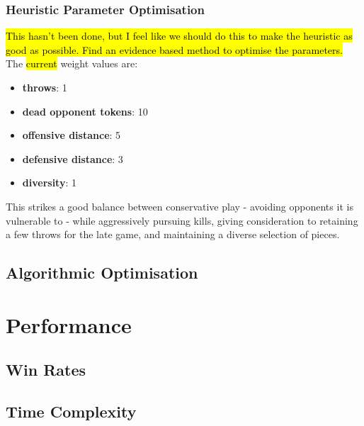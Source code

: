 \documentclass{article}
\begin{document}
\subsubsection{Heuristic Parameter Optimisation}
\hl{This hasn't been done, but I feel like we should do this to make the heuristic as good as possible. Find an evidence based method to optimise the parameters.}\\[2mm]
The \hl{current} weight values are:
\begin{itemize}
    \item \textbf{throws}: 1
    \item \textbf{dead opponent tokens}: 10
    \item \textbf{offensive distance}: 5
    \item \textbf{defensive distance}: 3
    \item \textbf{diversity}: 1
\end{itemize}
This strikes a good balance between conservative play - avoiding opponents it is vulnerable to - while aggressively pursuing kills, giving consideration to retaining a few throws for the late game, and maintaining a diverse selection of pieces.

\subsection{Algorithmic Optimisation}

\section{Performance}
\subsection{Win Rates}
\subsection{Time Complexity}

\newpage
\printbibliography
\end{document}
